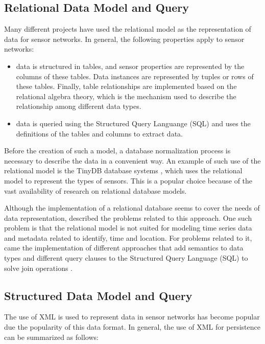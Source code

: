 \subsection{Relational Data Model and Query}

Many different projects have used the relational model \cite{relational-model}
as the representation of data for sensor networks. In general, the following
properties apply to sensor networks:

\begin{itemize}
  \item data is structured in tables, and sensor properties are represented by
  the columns of these tables. Data instances are represented by tuples or rows
  of these tables. Finally, table relationships are implemented based on the
  relational algebra theory, which is the mechanism used to describe the
  relationship among different data types.
  \item data is queried using the Structured Query Languange (SQL) and uses the
  definitions of the tables and columns to extract data.
\end{itemize}


Before the creation of such a model, a database normalization process is
necessary to describe the data in a convenient way. An example of such use of
the relational model is the TinyDB database systems \cite{sn-db-tinydb}, which
uses the relational model to represent the types of sensors. This is a popular
choice because of the vast availability of research on relational database
models.

Although the implementation of a relational database seems to cover the needs
of data representation, \cite{sn-data-model-survey} described the problems
related to this approach. One such problem is that the relational model is not
suited for modeling time series data and metadata related to identify, time
and location. For problems related to it, came the implementation of different
approaches that add semantics to data types and different query clauses to the
Structured Query Language (SQL) to solve join operations \cite{sn-db-newop}. 

\subsection{Structured Data Model and Query}

The use of XML is used to represent data in sensor networks has become popular
due the popularity of this data format. In general, the use of XML for
persistence can be summarized as follows:


